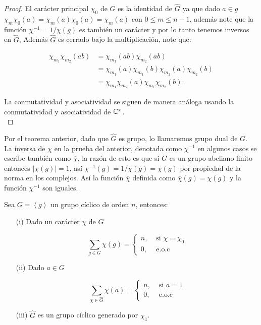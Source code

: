 \begin{proof}
El carácter principal $\chi_0$ de $G$ es la identidad de $\widehat{G}$ ya que dado $a\in g$ $\chi_m\chi_0(a)=\chi_m(a)\chi_0(a)=\chi_m(a)$ con $0\leq m\leq n-1$, además note que la función $\chi^{-1}=1/\chi(g)$ es también un carácter y por lo tanto tenemos inversos en $\widehat{G}$, Además $\widehat{G}$ es cerrado bajo la multiplicación, note que:

\begin{align*}
     \chi_{m_1}\chi_{m_2}(ab)&=\chi_{m_1}(ab)\chi_{m_2}(ab)\\
     &=\chi_{m_1}(a)\chi_{m_1}(b)\chi_{m_2}(a)\chi_{m_2}(b)\\
     &=\chi_{m_1}\chi_{m_2}(a)\chi_{m_1}\chi_{m_2}(b)
      .\end{align*}

    La conmutatividad y asociatividad se siguen de manera análoga usando la conmutatividad y asociatividad de $\mathbb{C}^{x}$.\\
\end{proof}

\begin{note}
Por el teorema anterior, dado que $\widehat{G}$ es grupo, lo llamaremos grupo dual de $G$.\\


La inversa de $\chi$ en la prueba del anterior, denotada  como $\chi^{-1}$ en algunos casos se escribe también como $\overline{\chi}$, la razón de esto es que si $G$ es un grupo abeliano finito entonces $|\chi(g)|=1$, así $\chi^{-1}(g)=1/\chi(g)=\overline{\chi(g)}$ por propiedad de la norma en los complejos. Así la función $\overline{\chi}$ definida como $\overline{\chi}(g)=\overline{\chi(g)}$ y la función $\chi^{-1}$ son iguales. \cite{pongsriiam2023analytic}
\end{note}

\begin{theorem}
Sea $G=\left\langle g\right\rangle$ un grupo cíclico de orden $n$, entonces:

\begin{itemize}
\item[(i)] Dado un carácter $\chi$ de $G$

$$
\sum_{g \in G} \chi(g)= \begin{cases}n, & \text { si } \chi=\chi_0 \\ 0, & \text { e.o.c }\end{cases}
$$

\item[(ii)] Dado $a \in G$

$$
\sum_{\chi \in \widehat{G}} \chi(a)= \begin{cases}n, & \text { si } a=1 \\ 0, & \text { e.o.c }\end{cases}
$$

\item[(iii)] $\widehat{G}$ es un grupo cíclico generado por $\chi_1$.
\end{itemize}

\end{theorem}


